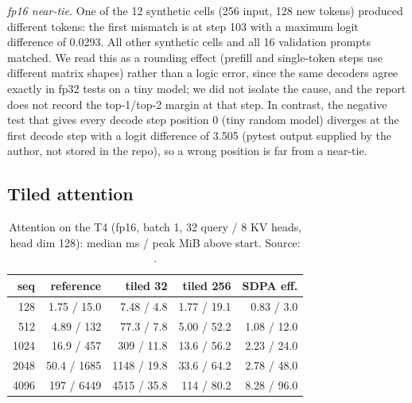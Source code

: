 \documentclass[conference]{IEEEtran}
\begin{document}
\emph{fp16 near-tie.} One of the 12 synthetic cells (256 input, 128 new tokens) produced different tokens: the first mismatch is at step 103 with a maximum logit difference of 0.0293. All other synthetic cells and all 16 validation prompts matched. We read this as a rounding effect (prefill and single-token steps use different matrix shapes) rather than a logic error, since the same decoders agree exactly in fp32 tests on a tiny model; we did not isolate the cause, and the report does not record the top-1/top-2 margin at that step. In contrast, the negative test that gives every decode step position 0 (tiny random model) diverges at the first decode step with a logit difference of 3.505 (pytest output supplied by the author, not stored in the repo), so a wrong position is far from a near-tie.

\subsection{Tiled attention}\label{sec:att}
\begin{table}[t]
\caption{Attention on the T4 (fp16, batch 1, 32 query / 8 KV heads, head dim 128): median ms / peak MiB above start. Source: \protect{}.}\label{tab:att}
\centering\footnotesize\setlength{\tabcolsep}{2.5pt}
\begin{tabular}{rrrrr}
\toprule
seq & reference & tiled 32 & tiled 256 & SDPA eff.\\
\midrule
128 & 1.75 / 15.0 & 7.48 / 4.8 & 1.77 / 19.1 & 0.83 / 3.0\\
512 & 4.89 / 132 & 77.3 / 7.8 & 5.00 / 52.2 & 1.08 / 12.0\\
1024 & 16.9 / 457 & 309 / 11.8 & 13.6 / 56.2 & 2.23 / 24.0\\
2048 & 50.4 / 1685 & 1148 / 19.8 & 33.6 / 64.2 & 2.78 / 48.0\\
4096 & 197 / 6449 & 4515 / 35.8 & 114 / 80.2 & 8.28 / 96.0\\
\bottomrule
\end{tabular}
\end{table}
\end{document}

